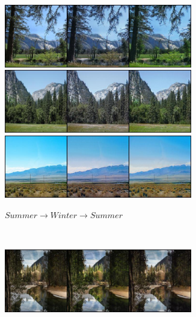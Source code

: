 \documentclass[10pt,twocolumn,letterpaper]{article}
\begin{document}
\begin{figure}[!htb]
     \centering
     \begin{subfigure}[]{0.49\textwidth}
         \centering
         \includegraphics[width=0.9\textwidth]{test_a_2_b_111(1)}\\
         \vspace{0.3cm}
		 \includegraphics[width=0.9\textwidth]{test_a_2_b_63}\\
		 \vspace{0.3cm}
		 \includegraphics[width=0.9\textwidth]{test_a_2_b_220}
		 \caption{$Summer \rightarrow Winter \rightarrow Summer$}
         \label{fig:summer2winter}
     \end{subfigure}
     ~
     \begin{subfigure}[]{0.49\textwidth}
         \centering
         \includegraphics[width=0.9\textwidth]{test_b_2_a_132}\\

\end{subfigure}
\end{figure}
\end{document}
